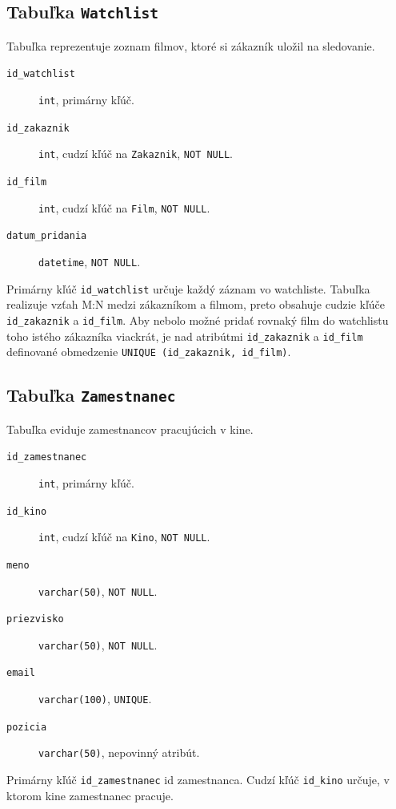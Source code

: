 \documentclass[11pt, a4paper]{article}
\begin{document}
\subsection{Tabuľka \texttt{Watchlist}}
Tabuľka reprezentuje zoznam filmov, ktoré si zákazník uložil na sledovanie.
\begin{description}
    \item[\texttt{id\_watchlist}] \texttt{int}, primárny kľúč.
    \item[\texttt{id\_zakaznik}] \texttt{int}, cudzí kľúč na \texttt{Zakaznik}, \texttt{NOT NULL}.
    \item[\texttt{id\_film}] \texttt{int}, cudzí kľúč na \texttt{Film}, \texttt{NOT NULL}.
    \item[\texttt{datum\_pridania}] \texttt{datetime}, \texttt{NOT NULL}.
\end{description}
Primárny kľúč \texttt{id\_watchlist} určuje každý záznam vo watchliste. Tabuľka realizuje
vzťah M:N medzi zákazníkom a filmom, preto obsahuje cudzie kľúče \texttt{id\_zakaznik} a
\texttt{id\_film}. Aby nebolo možné pridať rovnaký film do watchlistu toho istého zákazníka
viackrát, je nad atribútmi \texttt{id\_zakaznik} a \texttt{id\_film} definované obmedzenie
\texttt{UNIQUE (id\_zakaznik, id\_film)}.

\subsection{Tabuľka \texttt{Zamestnanec}}
Tabuľka eviduje zamestnancov pracujúcich v kine.
\begin{description}
    \item[\texttt{id\_zamestnanec}] \texttt{int}, primárny kľúč.
    \item[\texttt{id\_kino}] \texttt{int}, cudzí kľúč na \texttt{Kino}, \texttt{NOT NULL}.
    \item[\texttt{meno}] \texttt{varchar(50)}, \texttt{NOT NULL}.
    \item[\texttt{priezvisko}] \texttt{varchar(50)}, \texttt{NOT NULL}.
    \item[\texttt{email}] \texttt{varchar(100)}, \texttt{UNIQUE}.
    \item[\texttt{pozicia}] \texttt{varchar(50)}, nepovinný atribút.
\end{description}
Primárny kľúč \texttt{id\_zamestnanec} id zamestnanca.
Cudzí kľúč \texttt{id\_kino} určuje, v ktorom kine zamestnanec pracuje.
\end{document}
